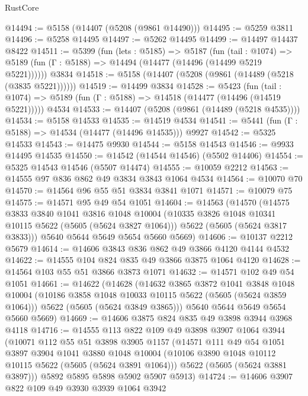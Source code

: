 \begin{lexlean}{RustCore}
\begin{coremodule}
@14494 := @5158 (@14407 (@5208 (@9861 @14490)))
@14495 := @5259 @3811
@14496 := @5258 @14495
@14497 := @5262 @14495
@14499 := @14497 @14437 @8422
@14511 := @5399
    (fun (lets : @5185) =>
    @5187
      (fun (tail : @1074) =>
      @5189 (fun (Γ : @5188) => @14494 (@14477 (@14496 (@14499 @5219 @5221))))))
    @3834
@14518 := @5158 (@14407 (@5208 (@9861 (@14489 (@5218 (@3835 @5221))))))
@14519 := @14499 @3834
@14528 := @5423
    (fun (tail : @1074) => @5189 (fun (Γ : @5188) => @14518 (@14477 (@14496 (@14519 @5221)))))
    @4534
@14533 := @14407 (@5208 (@9861 (@14489 (@5218 @4535))))
@14534 := @5158 @14533
@14535 := @14519 @4534
@14541 := @5441 (fun (Γ : @5188) => @14534 (@14477 (@14496 @14535))) @9927
@14542 := @5325 @14533
@14543 := @14475 @9930
@14544 := @5158 @14543
@14546 := @9933 @14495 @14535
@14550 := @14542 (@14544 @14546) (@5502 @14406)
@14554 := @5325 @14543 @14546 (@5507 @14474)
@14555 := @10059 @2212
@14563 := @14555 @97 @836 @862 @49 @3834 @3843 @1064 @4534
@14564 := @10070 @70
@14570 := @14564 @96 @55 @51 @3834 @3841 @1071
@14571 := @10079 @75
@14575 := @14571 @95 @49 @54 @1051
@14604 := @14563
    (@14570
      (@14575
        @3833
        @3840
        @1041
        @3816
        @1048
        @10004
        (@10335 @3826 @1048 @10341 @10115 @5622 (@5605 (@5624 @3827 @1064)))
        @5622
        (@5605 (@5624 @3817 @3833)))
      @5640
      @5644
      @5649
      @5654
      @5660
      @5669)
@14606 := @10137 @2212 @5679
@14614 := @14606 @3843 @836 @862 @49 @3866 @4120 @4144 @4532
@14622 := @14555 @104 @824 @835 @49 @3866 @3875 @1064 @4120
@14628 := @14564 @103 @55 @51 @3866 @3873 @1071
@14632 := @14571 @102 @49 @54 @1051
@14661 := @14622
    (@14628
      (@14632
        @3865
        @3872
        @1041
        @3848
        @1048
        @10004
        (@10186 @3858 @1048 @10033 @10115 @5622 (@5605 (@5624 @3859 @1064)))
        @5622
        (@5605 (@5624 @3849 @3865)))
      @5640
      @5644
      @5649
      @5654
      @5660
      @5669)
@14669 := @14606 @3875 @824 @835 @49 @3898 @3944 @3968 @4118
@14716 := @14555
    @113
    @822
    @109
    @49
    @3898
    @3907
    @1064
    @3944
    (@10071
      @112
      @55
      @51
      @3898
      @3905
      @1157
      (@14571
        @111
        @49
        @54
        @1051
        @3897
        @3904
        @1041
        @3880
        @1048
        @10004
        (@10106 @3890 @1048 @10112 @10115 @5622 (@5605 (@5624 @3891 @1064)))
        @5622
        (@5605 (@5624 @3881 @3897)))
      @5892
      @5895
      @5898
      @5902
      @5907
      @5913)
@14724 := @14606 @3907 @822 @109 @49 @3930 @3939 @1064 @3942

\end{coremodule}
\end{lexlean}
